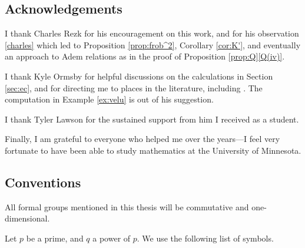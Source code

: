\documentclass{gtpart}
\theoremstyle{definition}
\theoremstyle{remark}
\newcommand{\q}[1]{Proposition \ref{prop:Q}\thinspace \eqref{Q(#1)}}
\numberwithin{equation}{section}
\numberwithin{thm}{section}
\begin{document}
\subsection{Acknowledgements}

I thank Charles Rezk for his encouragement on this work, and for his 
observation \eqref{charles} which led to Proposition \ref{prop:frob^2}, 
Corollary \ref{cor:K'}, and eventually an approach to Adem relations as 
in the proof of \q{iv}.  

I thank Kyle Ormsby for helpful discussions on the calculations in 
Section \ref{sec:ec}, and for directing me to places in the literature, 
including \cite{kohel}.  The computation in Example \ref{ex:velu} is out 
of his suggestion.  

I thank Tyler Lawson for the sustained support from him I received as a 
student.  

Finally, I am grateful to everyone who helped me over the years---I feel 
very fortunate to have been able to study mathematics at the University 
of Minnesota.  


\subsection{Conventions}

All formal groups mentioned in this thesis will be commutative and 
one-dimensional.  

Let $p$ be a prime, and $q$ a power of $p$.  We use the following list 
of symbols.  
\end{document}

